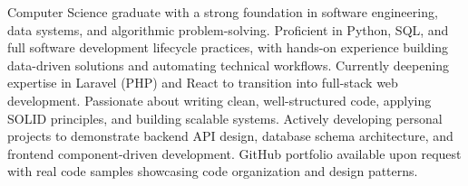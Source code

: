 

\begin{cvparagraph}

Computer Science graduate with a strong foundation in software engineering, data systems, and algorithmic problem-solving.
Proficient in Python, SQL, and full software development lifecycle practices, with hands-on experience building data-driven
solutions and automating technical workflows. Currently deepening expertise in Laravel (PHP) and React to transition into
full-stack web development. Passionate about writing clean, well-structured code, applying SOLID principles, and building
scalable systems. Actively developing personal projects to demonstrate backend API design, database schema architecture,
and frontend component-driven development. GitHub portfolio available upon request with real code samples showcasing
code organization and design patterns.

\end{cvparagraph}
